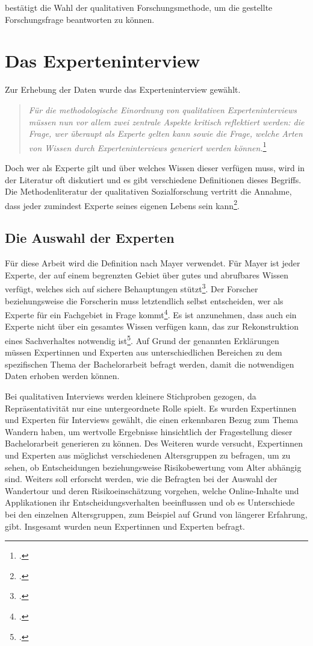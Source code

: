 bestätigt die Wahl der qualitativen Forschungsmethode, um die gestellte Forschungsfrage beantworten zu können.



\section{Das Experteninterview}

Zur Erhebung der Daten wurde das Experteninterview gewählt. 

\begin{quote}
	\textit{\glqq Für die methodologische Einordnung von qualitativen Experteninterviews müssen nun vor allem zwei zentrale Aspekte kritisch reflektiert werden: die Frage, wer überaupt als Experte gelten kann sowie die Frage, welche Arten von Wissen durch Experteninterviews generiert werden können.\grqq}\footcite[S. 35]{kaiser}
\end{quote}

Doch wer als Experte gilt und über welches Wissen dieser verfügen muss, wird in der Literatur oft diskutiert und es gibt verschiedene Definitionen dieses Begriffs.
Die Methodenliteratur der qualitativen Sozialforschung vertritt die Annahme, dass jeder zumindest Experte seines eigenen Lebens sein kann\footcite[S. 116]{przyborski}.

\subsection{Die Auswahl der Experten}

Für diese Arbeit wird die Definition nach Mayer verwendet. Für Mayer ist jeder Experte, der auf einem begrenzten Gebiet über gutes und abrufbares Wissen verfügt, welches sich auf sichere Behauptungen stützt\footcite[S. 41]{mayer}.
Der Forscher beziehungsweise die Forscherin muss letztendlich selbst entscheiden, wer als Experte für ein Fachgebiet in Frage kommt\footcite[S. 39]{kaiser}. Es ist anzunehmen, dass auch ein Experte nicht über ein gesamtes Wissen verfügen kann, das zur Rekonstruktion eines Sachverhaltes notwendig ist\footcite[S. 113]{glaeser}. Auf Grund der genannten Erklärungen müssen Expertinnen und Experten aus unterschiedlichen Bereichen zu dem spezifischen Thema der Bachelorarbeit befragt werden, damit die notwendigen Daten erhoben werden können.

Bei qualitativen Interviews werden kleinere Stichproben gezogen, da Repräsentativität nur eine untergeordnete Rolle spielt. Es wurden Expertinnen und Experten für Interviews gewählt, die einen erkennbaren Bezug zum Thema Wandern haben, um wertvolle Ergebnisse hinsichtlich der Fragestellung dieser Bachelorarbeit generieren zu können. Des Weiteren wurde versucht, Expertinnen und Experten aus möglichst verschiedenen Altersgruppen zu befragen, um zu sehen, ob Entscheidungen beziehungsweise Risikobewertung vom Alter abhängig sind.  Weiters soll erforscht werden, wie die Befragten bei der Auswahl der Wandertour und deren Risikoeinschätzung vorgehen, welche Online-Inhalte und Applikationen ihr Entscheidungsverhalten beeinflussen und ob es Unterschiede bei den einzelnen Altersgruppen, zum Beispiel auf Grund von längerer Erfahrung, gibt. Insgesamt wurden neun Expertinnen und Experten befragt.

